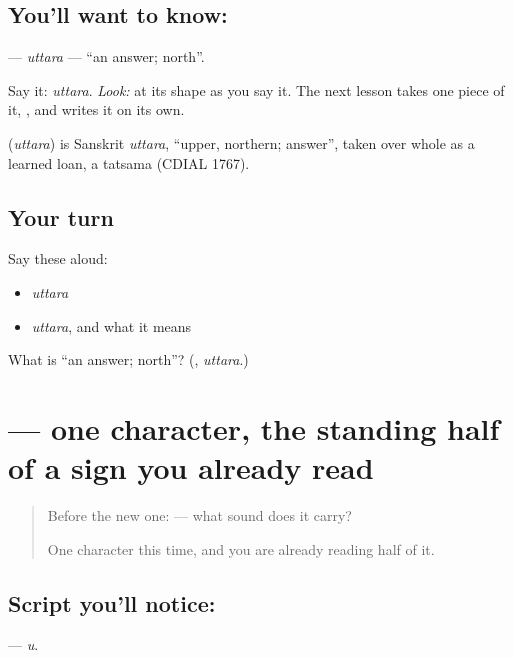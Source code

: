 \subsection*{You'll want to know: }
\textbf{} — \emph{uttara} — \textquotedblleft{}an answer; north\textquotedblright{}.

Say it: \emph{uttara}. \emph{Look:} at its shape as you say it. The next lesson takes one piece of it, \textbf{}, and writes it on its own.

\begin{cousinweb}
\textbf{} (\emph{uttara}) is Sanskrit \emph{uttara}, \textquotedblleft{}upper, northern; answer\textquotedblright{}, taken over whole as a learned loan, a tatsama (CDIAL 1767).
\end{cousinweb}

\subsection*{Your turn}
Say these aloud:

\begin{itemize}
\raggedright
  \item \emph{uttara}
  \item \emph{uttara}, and what it means
\end{itemize}

\begin{tcolorbox}[breakable,colback=teal!4,colframe=teal!35!black,title={Before you move on}]
What is \textquotedblleft{}an answer; north\textquotedblright{}? (\textbf{}, \emph{uttara}.)
\end{tcolorbox}
\section[\texorpdfstring{\kn{ಉ} (u)}{ಉ (u)}]{ — one character, the standing half of a sign you already read}

\label{lesson:KA-S126-letter-u}



\begin{quote}
Before the new one:  — what sound does it carry?

One character this time, and you are already reading half of it.
\end{quote}

\subsection*{Script you'll notice: }
\textbf{} — \emph{u}.

